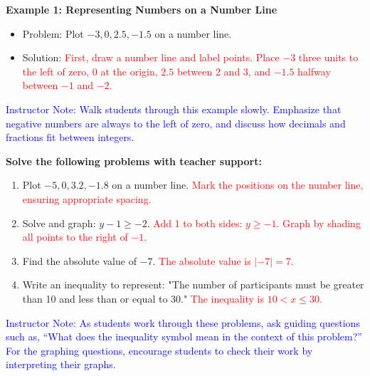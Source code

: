 \documentclass[12pt]{article}
\begin{document}
\begin{tcolorbox}[colframe=black!60, colback=white, 
coltitle=black, colbacktitle=black!15, fonttitle=\bfseries\Large, 
title=Examples, halign title=center, left=10pt, right=10pt, top=10pt, bottom=15pt]
\textbf{Example 1: Representing Numbers on a Number Line}
\begin{itemize}
    \item Problem: Plot \( -3, 0, 2.5, -1.5 \) on a number line.
    \item Solution: \textcolor{red}{First, draw a number line and label points. Place \( -3 \) three units to the left of zero, \( 0 \) at the origin, \( 2.5 \) between \( 2 \) and \( 3 \), and \( -1.5 \) halfway between \( -1 \) and \( -2 \).}
    \begin{center}
    \end{center}
\end{itemize}

\textcolor{blue}{Instructor Note: Walk students through this example slowly. Emphasize that negative numbers are always to the left of zero, and discuss how decimals and fractions fit between integers.}
\end{tcolorbox}

\begin{tcolorbox}[colframe=black!60, colback=white, 
coltitle=black, colbacktitle=black!15, fonttitle=\bfseries\Large, 
title=Guided Practice, halign title=center, left=10pt, right=10pt, top=10pt, bottom=15pt]
\textbf{Solve the following problems with teacher support:}
\begin{enumerate}[itemsep=3em]
    \item Plot \( -5, 0, 3.2, -1.8 \) on a number line. \textcolor{red}{Mark the positions on the number line, ensuring appropriate spacing.}
    \item Solve and graph: \( y - 1 \geq -2 \). \textcolor{red}{Add 1 to both sides: \( y \geq -1 \). Graph by shading all points to the right of \( -1 \).}
    \item Find the absolute value of \( -7 \). \textcolor{red}{The absolute value is \( | -7 | = 7 \).}
    \item Write an inequality to represent: "The number of participants must be greater than 10 and less than or equal to 30." \textcolor{red}{The inequality is \( 10 < x \leq 30 \).}
\end{enumerate}

\textcolor{blue}{Instructor Note: As students work through these problems, ask guiding questions such as, “What does the inequality symbol mean in the context of this problem?” For the graphing questions, encourage students to check their work by interpreting their graphs.}
\end{tcolorbox}
\end{document}
